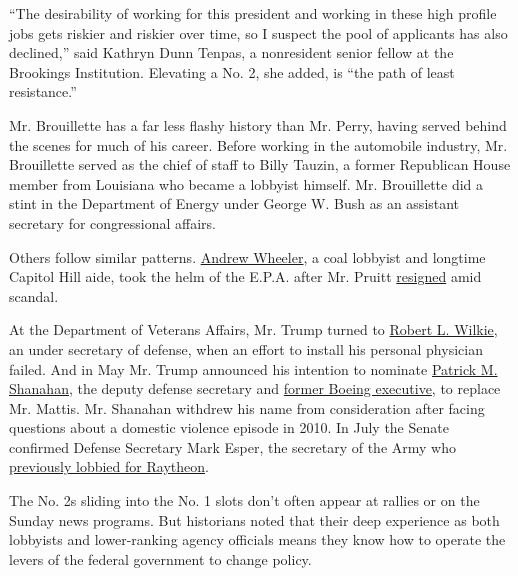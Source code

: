 ``The desirability of working for this president and working in these
high profile jobs gets riskier and riskier over time, so I suspect the
pool of applicants has also declined,'' said Kathryn Dunn Tenpas, a
nonresident senior fellow at the Brookings Institution. Elevating a No.
2, she added, is ``the path of least resistance.''

Mr. Brouillette has a far less flashy history than Mr. Perry, having
served behind the scenes for much of his career. Before working in the
automobile industry, Mr. Brouillette served as the chief of staff to
Billy Tauzin, a former Republican House member from Louisiana who became
a lobbyist himself. Mr. Brouillette did a stint in the Department of
Energy under George W. Bush as an assistant secretary for congressional
affairs.

Others follow similar patterns.
\href{https://www.nytimes3xbfgragh.onion/2019/02/28/climate/andrew-wheeler-epa-confirmation.html}{Andrew
Wheeler}, a coal lobbyist and longtime Capitol Hill aide, took the helm
of the E.P.A. after Mr. Pruitt
\href{https://www.nytimes3xbfgragh.onion/2018/07/05/climate/scott-pruitt-epa-trump.html}{resigned}
amid scandal.

At the Department of Veterans Affairs, Mr. Trump turned to
\href{https://www.nytimes3xbfgragh.onion/2018/07/23/us/politics/senate-confirms-robert-wilkie-veterans-affairs.html}{Robert
L. Wilkie}, an under secretary of defense, when an effort to install his
personal physician failed. And in May Mr. Trump announced his intention
to nominate
\href{https://www.nytimes3xbfgragh.onion/2019/05/09/us/politics/patrick-shanahan-defense-department.html}{Patrick
M. Shanahan}, the deputy defense secretary and
\href{https://www.nytimes3xbfgragh.onion/2019/04/25/us/politics/defense-shanahan-boeing-cleared.html}{former
Boeing executive}, to replace Mr. Mattis. Mr. Shanahan withdrew his name
from consideration after facing questions about a domestic violence
episode in 2010. In July the Senate confirmed Defense Secretary Mark
Esper, the secretary of the Army who
\href{https://www.nytimes3xbfgragh.onion/2019/04/25/us/politics/defense-shanahan-boeing-cleared.html}{previously
lobbied for Raytheon}.

The No. 2s sliding into the No. 1 slots don't often appear at rallies or
on the Sunday news programs. But historians noted that their deep
experience as both lobbyists and lower-ranking agency officials means
they know how to operate the levers of the federal government to change
policy.

